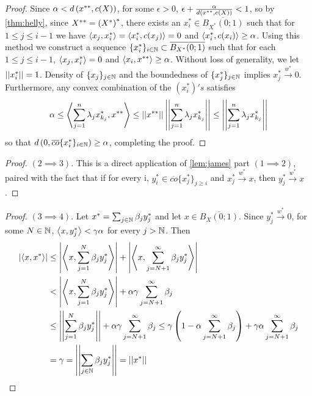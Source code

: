 \begin{thm}
\begin{proof}
        Since $\alpha < d\left( x^{**}, c(X)\right)$, for some $\epsilon > 0$, $\epsilon + \frac{\alpha}{d\left( x^{**},c(X)\right)}<1$, so by \ref{thm:helly}, since $X^{**}=\left( X^*\right)^*$, there exists an $x_i^* \in \overline{B_{X^*}(0;1)}$ such that for $1 \leq j \leq i-1$ we have $\left\langle x_j,x_i^* \right\rangle=\left\langle x_i^*,c(x_j) \right\rangle = 0$ and $\left\langle x_i^*,c(x_i) \right\rangle \geq \alpha$.
        Using this method we construct a sequence $\{x_i^*\}_{i \in \mathbb{N}} \subset \overline{B_{X^*}(0;1)}$ such that for each $1 \leq j \leq i-1$, $\left\langle x_j,x_i^* \right\rangle = 0$ and $\left\langle x_i,x^{**} \right\rangle \geq \alpha$. Without loss of generality, we let $\left|\left| x_i^* \right|\right| = 1$.  Density of $\{x_j\}_{j \in \mathbb{N}}$ and the boundedness of $\{x_j^*\}_{j \in \mathbb{N}}$ implies $x_j^* \overset{w^*}{\to} 0.$
        Furthermore, any convex combination of the $(x_i^*)'s$ satisfies \begin{equation}
            \alpha \leq \left\langle \sum_{j=1}^n \lambda_j x_{k_j}^*, x^{**} \right\rangle\leq \left|\left| x^{**} \right|\right| \left|\left| \sum_{j=1}^n \lambda_j x_{k_j}^* \right|\right| \leq \left|\left| \sum_{j=1}^n \lambda_j x_{k_j}^* \right|\right|
        \end{equation}
        so that $d\left( 0,\overline{co}\{x_i^*\}_{i \in \mathbb{N}}\right) \geq \alpha$, completing the proof. \end{proof}
    \begin{proof} $(2 \implies 3)$. 
        This is a direct application of \ref{lem:james} part $(1 \implies 2)$, paired with the fact that if for every i, $y_i^* \in \overline{co}\{x_j^*\}_{j \geq i}$ and $x_j^* \overset{w^*}{\to} x$, then $y_j^* \overset{w^*}{\to} x$. 
    \end{proof} 
    \begin{proof} $(3 \implies 4)$.
        Let $x^* = \sum_{j \in \mathbb{N}} \beta_j y_j^*$ and let $x \in \overline{B_X(0;1)}$. Since $y_j^* \overset{w^*}{\to} 0$, for some $N \in \mathbb{N}$, $\left\langle x,y_j^* \right\rangle < \gamma \alpha$ for every $j > \mathbb{N}$. Then
        \begin{equation}
            \begin{split}
                \abs{\ip{x, x^*}} & \leq \abs{ \ip{x,\sum_{j=1}^N \beta_j y_j^*}} + \abs{\ip{x,\sum_{j=N+1}^{\infty} \beta_j y_j^*}}\\
                & < \abs{\ip{x,\sum_{j=1}^N \beta_j y_j^*}} + \alpha \gamma \sum_{j=N+1}^{\infty} \beta_j\\
                & \leq \norm{\sum_{j=1}^N \beta_j y_j^*} + \alpha \gamma \sum_{j=N+1}^\infty \beta_j \leq \gamma \pa{1-\alpha \sum_{j=N+1}^\infty \beta_j}+ \gamma \alpha \sum_{j=N+1}^\infty \beta_j \\
                &= \gamma = \norm{\sum_{j \in \N} \beta_j y_j^*} = \norm{x^*}

\end{split}
\end{equation}
\end{proof}
\end{thm}
